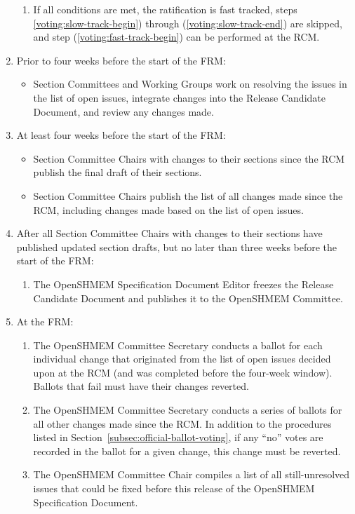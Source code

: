 \begin{enumerate}
\begin{enumerate}
    \item If all conditions are met, the ratification is fast tracked,
      steps \ref{voting:slow-track-begin}) through
        (\ref{voting:slow-track-end}) are skipped, and step
        (\ref{voting:fast-track-begin}) can be performed at the RCM.
  \end{enumerate}

\item\label{voting:slow-track-begin} Prior to four weeks before the
  start of the FRM:
  \label{subsec:official-ballot-voting:t-4weeks-frm}
  \begin{itemize}
  \item Section Committees and Working Groups work on resolving the
    issues in the list of open issues, integrate changes
    into the Release Candidate Document, and review any
    changes made.
  \end{itemize}

\item At least four weeks before the start of the FRM:
  \begin{itemize}
  \item Section Committee Chairs with changes to their sections since
    the RCM publish the final draft of their sections.
  \item Section Committee Chairs publish the list of all
    changes made since the RCM, including changes made based on the
    list of open issues.
  \end{itemize}

\item After all Section Committee Chairs with changes to their
  sections have published updated section drafts, but no later than
  three weeks before the start of the FRM:
  \begin{enumerate}
  \item The OpenSHMEM Specification Document Editor freezes the Release Candidate
    Document and publishes it to the OpenSHMEM Committee.
  \end{enumerate}

\item At the FRM:
  \begin{enumerate}
  \item The OpenSHMEM Committee Secretary conducts a ballot for each individual
    change that originated from the list of open issues decided upon
    at the RCM (and was completed before the four-week window).
    Ballots that fail must have their changes reverted.
  \item\label{voting:slow-track-end} The OpenSHMEM Committee Secretary conducts
    a series of ballots for all other changes made since the RCM.  In
    addition to the procedures listed in
    Section~\ref{subsec:official-ballot-voting}, if any ``no'' votes
    are recorded in the ballot for a given change, this change must be
    reverted.
  \item\label{voting:fast-track-begin} The OpenSHMEM Committee Chair compiles a
    list of all still-unresolved issues that could be fixed before
    this release of the OpenSHMEM Specification Document.


\end{enumerate}
\end{enumerate}
